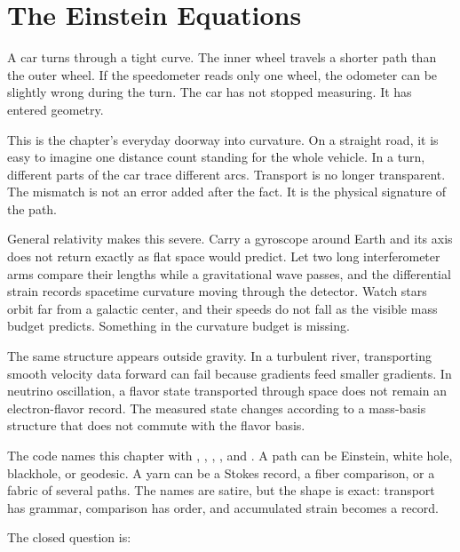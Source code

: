 \chapter{The Einstein Equations}
\label{chap:the-einstein-equations}


\begin{chapteressay}

A car turns through a tight curve. The inner wheel travels a shorter path than
the outer wheel. If the speedometer reads only one wheel, the odometer can be
slightly wrong during the turn. The car has not stopped measuring. It has
entered geometry.

This is the chapter's everyday doorway into curvature. On a straight road, it
is easy to imagine one distance count standing for the whole vehicle. In a
turn, different parts of the car trace different arcs. Transport is no longer
transparent. The mismatch is not an error added after the fact. It is the
physical signature of the path.

General relativity makes this severe. Carry a gyroscope around Earth and its
axis does not return exactly as flat space would predict. Let two long
interferometer arms compare their lengths while a gravitational wave passes,
and the differential strain records spacetime curvature moving through the
detector. Watch stars orbit far from a galactic center, and their speeds do not
fall as the visible mass budget predicts. Something in the curvature budget is
missing.

The same structure appears outside gravity. In a turbulent river, transporting
smooth velocity data forward can fail because gradients feed smaller gradients.
In neutrino oscillation, a flavor state transported through space does not
remain an electron-flavor record. The measured state changes according to a
mass-basis structure that does not commute with the flavor basis.

The code names this chapter with , ,
, , and . A path can be
Einstein, white hole, blackhole, or geodesic. A yarn can be a Stokes record, a
fiber comparison, or a fabric of several paths. The names are satire, but the
shape is exact: transport has grammar, comparison has order, and accumulated
strain becomes a record.

The closed question is:


\end{chapteressay}

